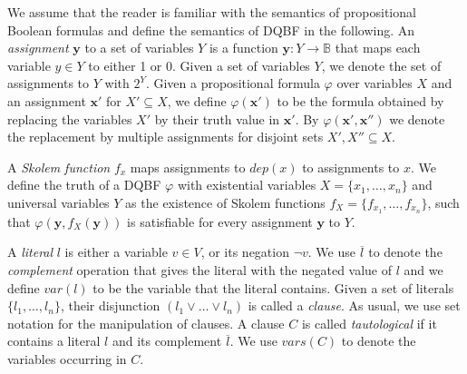 \documentclass{svjour3}
\newcommand{\set}[1]{{\{#1\}}}
\newcommand{\dep}{\mathit{dep}}
\newcommand{\var}{\mathit{var}}
\newcommand{\assignment}{\alpha}
\newcommand{\Assignment}{\mathcal{A}}
\newcommand{\ass}[1]{\mathbf{#1}}
\begin{document}
We assume that the reader is familiar with the semantics of propositional Boolean formulas and define the semantics of DQBF in the following.
An \emph{assignment} $\ass y$ to a set of variables $Y$ is a function $\ass y : Y \rightarrow \mathbb B$ that maps each variable $y \in Y$ to either 1 or 0. 
Given a set of variables $Y$, we denote the set of assignments to $Y$ with $2^Y$.
Given a propositional formula $\varphi$ over variables $X$ and an assignment $\ass x'$ for $X'\subseteq X$, we define $\varphi(\ass x')$ to be the formula obtained by replacing the variables $X'$ by their truth value in $\ass x'$.
By $\varphi(\ass x',\ass x'')$ we denote the replacement by multiple assignments for disjoint sets $X',X''\subseteq X$. 

A \emph{Skolem function} $f_x$ maps assignments to $\dep(x)$ to assignments to $x$. 
We define the truth of a DQBF $\varphi$ with existential variables $X=\{x_1,\dots,x_n\}$ and universal variables $Y$ as the existence of Skolem functions $f_X=\{f_{x_1},\dots,f_{x_n}\}$, such that $\varphi(\ass y, f_X(\ass y))$ is satisfiable for every assignment $\ass y$ to $Y$. 

A \emph{literal} $l$ is either a variable $v \in V$, or its negation $\neg v$. 
We use $\overline{l}$ to denote the \emph{complement} operation that gives the literal with the negated value of $l$ and we define $\var(l)$ to be the variable that the literal contains.
Given a set of literals $\set{l_1,\dots,l_n}$, their disjunction $(l_1 \lor \ldots \lor l_n)$ is called a \emph{clause}. %
As usual, we use set notation for the manipulation of clauses.
A clause $C$ is called \emph{tautological} if it contains a literal $l$ and its complement $\overline{l}$.
\newcommand{\vars}{\mathit{vars}}
We use $\vars(C)$ to denote the variables occurring in $C$.
\end{document}
